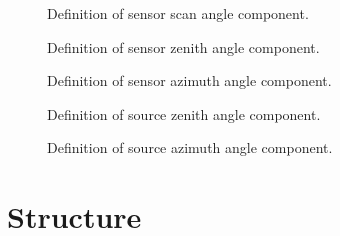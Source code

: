 \begin{figure}[htp]
  \centering
  
  \caption{Definition of \Geometry{} sensor scan angle component.}
  \label{fig:geo_sensor_scan_angle}
\end{figure}

\begin{figure}[htp]
  \centering
  
  \caption{Definition of \Geometry{} sensor zenith angle component.}
  \label{fig:geo_sensor_zenith_angle}
\end{figure}

\begin{figure}[htp]
  \centering
  
  \caption{Definition of \Geometry{} sensor azimuth angle component.}
  \label{fig:geo_sensor_azimuth_angle}
\end{figure}

\begin{figure}[htp]
  \centering
  
  \caption{Definition of \Geometry{} source zenith angle component.}
  \label{fig:geo_source_zenith_angle}
\end{figure}

\begin{figure}[htp]
  \centering
  
  \caption{Definition of \Geometry{} source azimuth angle component.}
  \label{fig:geo_source_azimuth_angle}
\end{figure}

\clearpage












\clearpage
\section{\RTSolution{} Structure}
\label{sec:rtsolution_structure}



